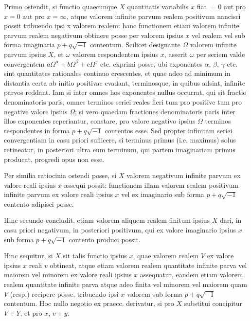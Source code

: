 \documentclass[14pt]{memoir}
\theoremstyle{plain}
\theoremstyle{remark}
\begin{document}
Primo ostendit, si functio quaecunque \(X\) quantitatis variabilis \(x\) fiat \(= 0\) aut pro \(x = 0\) aut pro \(x = \infty\), atque valorem infinite parvum realem positivum nancisci possit tribuendo ipsi x valorem realem: hanc functionem etiam valorem infinite parvum realem negativum obtinere posse per valorem ipsius \(x\) vel realem vel sub forma imaginaria \(p+q\surd{-1}\) contentum. Scilicet designante \(\Omega\) valorem infinite parvum ipsius \(X\), et \(\omega\) valorem respondentem ipsius \(x\), asserit \(\omega\) per seriem valde convergentem \(a\Omega^{\alpha} + b \Omega^{\beta} + c \Omega^{\gamma} \) etc. exprimi posse, ubi exponentes \(\alpha\), \(\beta\), \(\gamma\) etc. sint quantitates rationales continuo crescentes, et quae adeo ad minimum in distantia certa ab initio positivae evadant, terminosque, in quibus adsint, infinite parvos reddant. Iam si inter omnes hos exponentes nullus occurrat, qui sit fractio denominatoris paris, omnes terminos seriei reales fieri tum pro positive tum pro negative valore ipsius \(\Omega\); si vero quaedam fractiones denominatoris paris inter illos exponentes reperiantur, constare, pro valore negativo ipsius \(\Omega\) terminos respondentes in forma \(p+q\surd{-1}\) contentos esse. Sed propter infinitam seriei convergentiam in casu priori sufiicere, si terminus primus (i.e. maximus) solus retineatur, in posteriori ultra eum terminum, qui partem imaginariam primus producat, progredi opus non esse.

Per similia ratiocinia ostendi posse, si \(X\) valorem negativum infinite parvum ex valore reali ipsius \(x\) assequi possit: functionem illam valorem realem positivum infinite parvum ex valore reali ipsius \(x\) vel ex imaginario sub forma \(p+q\surd{-1}\)  contento adipisci posse.

Hinc secundo concludit, etiam valorem aliquem realem finitum ipsius \(X\) dari, in casu priori negativum, in posteriori positivum, qui ex valore imaginario ipsius \(x\) sub forma \(p+q\surd{-1}\)  contento produci possit.

Hinc sequitur, si \(X\) sit talis functio ipsius \(x\), quae valorem realem \(V\) ex valore ipsius \(x\) reali \(v\) obtineat, atque etiam valorem realem quantitate infinite parva vel maiorem vel minorem ex valore reali ipsius \(x\) assequatur, eandem etiam valorem realem quantitate infinite parva atque adeo finita vel minorem vel maiorem quam \(V\) (resp.) recipere posse, tribuendo ipsi \(x\) valorem sub forma \(p+q\surd{-1}\)  contentum. Hoc nullo negotio ex praecc. derivatur, si pro \(X\) substitui concipitur  \(V + Y\),  et pro \(x\), \(v+y\).
\end{document}
